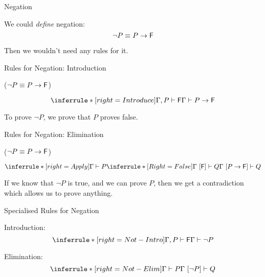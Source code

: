 \documentclass[xetex,aspectratio=169,14pt,hyperref={pdfpagelabels=true,pdflang={en-GB}}]{beamer}
\begin{document}

\begin{frame}
  {Negation}

  We could \emph{define} negation:
  \begin{displaymath}
    \lnot P \equiv P \to \mathsf{F}
  \end{displaymath}

  \bigskip

  Then we wouldn't need any rules for it.
\end{frame}

\begin{frame}
  {Rules for Negation: Introduction}

  \textcolor{black!60}{($\lnot P \equiv P \to \mathsf{F}$)}

  \medskip

  \begin{displaymath}
    \inferrule* [right=Introduce]
    {\Gamma, P \vdash \false}
    {\Gamma \vdash P \to \false}
  \end{displaymath}

  \bigskip

  To prove $\lnot P$, we prove that $P$ proves false.
\end{frame}

\begin{frame}
  {Rules for Negation: Elimination}

  \textcolor{black!60}{($\lnot P \equiv P \to \mathsf{F}$)}

  \medskip

  \begin{displaymath}
    \inferrule* [right=Apply]
    {\Gamma \vdash P \\ \inferrule* [Right=False] { } {\Gamma~[\false] \vdash Q}}
    {\Gamma~[P \to \false] \vdash Q}
  \end{displaymath}

  \bigskip

  If we know that $\lnot P$ is true, and we can prove $P$, then we get
  a contradiction which allows us to prove anything.
\end{frame}

\begin{frame}
  {Specialised Rules for Negation}

  Introduction:
  \begin{displaymath}
    \inferrule* [right=Not-Intro]
    {\Gamma, P \vdash \false}
    {\Gamma \vdash \lnot P}
  \end{displaymath}

  \bigskip

  Elimination:
  \begin{displaymath}
    \inferrule* [right=Not-Elim]
    {\Gamma \vdash P}
    {\Gamma~[\lnot P] \vdash Q}
  \end{displaymath}
\end{frame}
\end{document}
